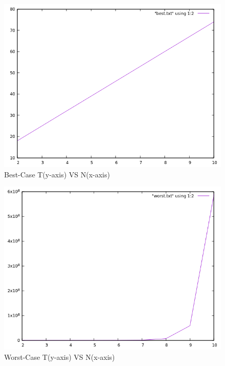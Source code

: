 \documentclass[conference]{IEEEtran}
\begin{document}
\begin{figure}[H]
  \begin{center}
    \includegraphics[scale=0.5]{best.png} 
    \caption{Best-Case T(y-axis) VS N(x-axis) }\label{Saturation}
  \end{center}
\end{figure}

\begin{figure}[H]
  \begin{center}
    \includegraphics[scale=0.5]{worst.png} 
    \caption{Worst-Case T(y-axis) VS N(x-axis) }\label{Saturation}
  \end{center}
\end{figure}
\end{document}
